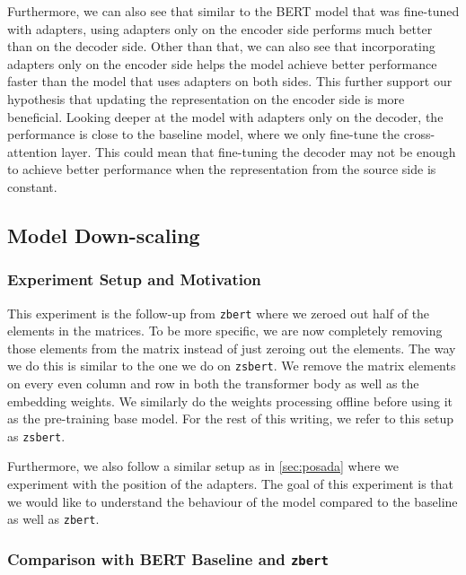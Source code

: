 Furthermore, we can also see that similar to the BERT model that was fine-tuned with adapters, using adapters only on the encoder side performs much better than on the decoder side. Other than that, we can also see that incorporating adapters only on the encoder side helps the model achieve better performance faster than the model that uses adapters on both sides. This further support our hypothesis that updating the representation on the encoder side is more beneficial. Looking deeper at the model with adapters only on the decoder, the performance is close to the baseline model, where we only fine-tune the cross-attention layer. This could mean that fine-tuning the decoder may not be enough to achieve better performance when the representation from the source side is constant.

\subsection{Model Down-scaling}
\subsubsection{Experiment Setup and Motivation}
This experiment is the follow-up from \texttt{zbert} where we zeroed out half of the elements in the matrices. To be more specific, we are now completely removing those elements from the matrix instead of just zeroing out the elements. The way we do this is similar to the one we do on \texttt{zsbert}. We remove the matrix elements on every even column and row in both the transformer body as well as the embedding weights. We similarly do the weights processing offline before using it as the pre-training base model. For the rest of this writing, we refer to this setup as \texttt{zsbert}.

Furthermore, we also follow a similar setup as in \cref{sec:posada} where we experiment with the position of the adapters. The goal of this experiment is that we would like to understand the behaviour of the model compared to the baseline as well as \texttt{zbert}.

\subsubsection{Comparison with BERT Baseline and \texttt{zbert}}

